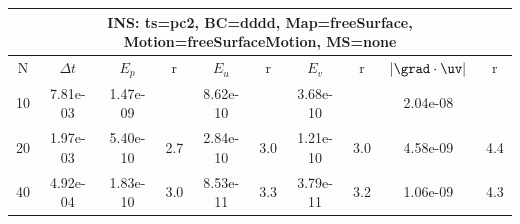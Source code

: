 
\begin{tabular}{|c|c|c|c|c|c|c|c|c|c|} \hline
 \multicolumn{10}{|c|}{INS: ts=pc2, BC=dddd, Map=freeSurface, Motion=freeSurfaceMotion, MS=none } \\ \hline 
     N  &   $\Delta t$ & $E_p$   &  r  &   $E_u$   &   r    &   $E_v$   & r   &  $|\grad\cdot\uv|$  & r   \\ \hline 
  10   &  7.81e-03  &   1.47e-09  &        &   8.62e-10  &        &   3.68e-10  &        &   2.04e-08  &        \\ 
  20   &  1.97e-03  &   5.40e-10  & 2.7  &   2.84e-10  & 3.0  &   1.21e-10  & 3.0  &   4.58e-09  & 4.4  \\ 
  40   &  4.92e-04  &   1.83e-10  & 3.0  &   8.53e-11  & 3.3  &   3.79e-11  & 3.2  &   1.06e-09  & 4.3  \\ 
 \hline 
\end{tabular}
